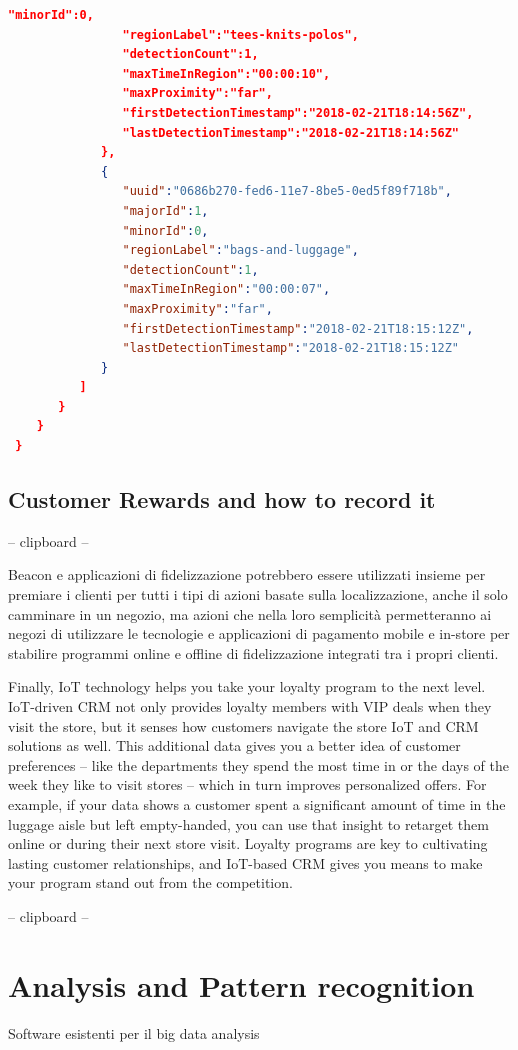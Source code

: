 \begin{lstlisting}[language=json,firstnumber=1]
                "minorId":0,
                "regionLabel":"tees-knits-polos",
                "detectionCount":1,
                "maxTimeInRegion":"00:00:10",
                "maxProximity":"far",
                "firstDetectionTimestamp":"2018-02-21T18:14:56Z",
                "lastDetectionTimestamp":"2018-02-21T18:14:56Z"
             },
             {
                "uuid":"0686b270-fed6-11e7-8be5-0ed5f89f718b",
                "majorId":1,
                "minorId":0,
                "regionLabel":"bags-and-luggage",
                "detectionCount":1,
                "maxTimeInRegion":"00:00:07",
                "maxProximity":"far",
                "firstDetectionTimestamp":"2018-02-21T18:15:12Z",
                "lastDetectionTimestamp":"2018-02-21T18:15:12Z"
             }
          ]
       }
    }
 }
  \end{lstlisting}
\vspace{0.5cm}





\subsection{Customer Rewards and how to record it }


-- clipboard --

Beacon e applicazioni di fidelizzazione potrebbero essere utilizzati insieme per premiare i clienti per tutti i tipi di azioni basate sulla localizzazione, anche il solo camminare in un negozio, ma azioni che nella loro semplicità permetteranno ai negozi di utilizzare le tecnologie e applicazioni di pagamento mobile e in-store per stabilire programmi online e offline di fidelizzazione integrati tra i propri clienti.

Finally, IoT technology helps you take your loyalty program to the next level. IoT-driven CRM not only provides loyalty members with VIP deals when they visit the store, but it senses how customers navigate the store IoT and CRM solutions as well. This additional data gives you a better idea of customer preferences – like the departments they spend the most time in or the days of the week they like to visit stores – which in turn improves personalized offers. For example, if your data shows a customer spent a significant amount of time in the luggage aisle but left empty-handed, you can use that insight to retarget them online or during their next store visit. Loyalty programs are key to cultivating lasting customer relationships, and IoT-based CRM gives you means to make your program stand out from the competition.

-- clipboard --

\section{Analysis and Pattern recognition}

Software esistenti per il big data analysis



